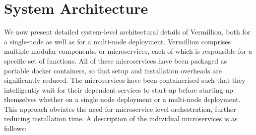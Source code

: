 \documentclass[conference, 10pt]{IEEEtran}
\begin{document}
\section{System Architecture}

We now present detailed system-level architectural details of Vermillion, both for a single-node as well as for a multi-node deployment. Vermillion comprises multiple modular components, or microservices, each of which is responsible for a specific set of functions. All of these microservices have been packaged as portable docker containers, so that setup and installation overheads are significantly reduced. The microservices have been containerised such that they intelligently wait for their dependent services to start-up before starting-up themselves whether on a single node deployment or a multi-node deployment. This approach obviates the need for microservice level orchestration, further reducing installation time.  A description of the individual microservices is as follows:
\end{document}
